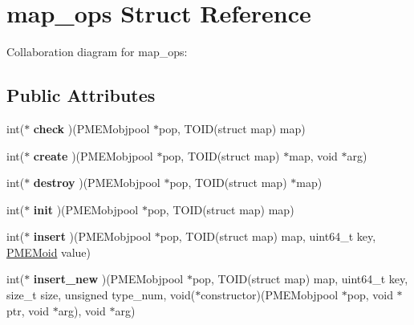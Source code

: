 \hypertarget{structmap__ops}{}\section{map\+\_\+ops Struct Reference}
\label{structmap__ops}


Collaboration diagram for map\+\_\+ops\+:
\subsection*{Public Attributes}
\begin{DoxyCompactItemize}
\item 
\mbox{\label{structmap__ops_a611f04cee72408cc665f78bac7a59298}} 
int($\ast$ {\bfseries check} )(P\+M\+E\+Mobjpool $\ast$pop, T\+O\+ID(struct map) map)
\item 
\mbox{\label{structmap__ops_a280e6586982dff19cf76de14a94ec872}} 
int($\ast$ {\bfseries create} )(P\+M\+E\+Mobjpool $\ast$pop, T\+O\+ID(struct map) $\ast$map, void $\ast$arg)
\item 
\mbox{\label{structmap__ops_a7da4b7d3052295e8040e8e6d4f9520e7}} 
int($\ast$ {\bfseries destroy} )(P\+M\+E\+Mobjpool $\ast$pop, T\+O\+ID(struct map) $\ast$map)
\item 
\mbox{\label{structmap__ops_a0da5620e4a44370970fd7ec0f27a52a7}} 
int($\ast$ {\bfseries init} )(P\+M\+E\+Mobjpool $\ast$pop, T\+O\+ID(struct map) map)
\item 
\mbox{\label{structmap__ops_a73d369ba1a875cb498e449a958e97edb}} 
int($\ast$ {\bfseries insert} )(P\+M\+E\+Mobjpool $\ast$pop, T\+O\+ID(struct map) map, uint64\+\_\+t key, \hyperlink{structpmemoid}{P\+M\+E\+Moid} value)
\item 
\mbox{\label{structmap__ops_a79d86ddd52e0f4249246c14a07734f38}} 
int($\ast$ {\bfseries insert\+\_\+new} )(P\+M\+E\+Mobjpool $\ast$pop, T\+O\+ID(struct map) map, uint64\+\_\+t key, size\+\_\+t size, unsigned type\+\_\+num, void($\ast$constructor)(P\+M\+E\+Mobjpool $\ast$pop, void $\ast$ptr, void $\ast$arg), void $\ast$arg)
\item 
\mbox{\label{structmap__ops_a10a522fc26b22b0ff1942ce9d8f0aa7f}} 

\end{DoxyCompactItemize}
